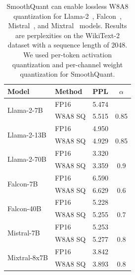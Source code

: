 \begin{table}
\setlength{\tabcolsep}{8pt}
\small
\centering
\caption{SmoothQuant can enable lossless W8A8 quantization for Llama-2~\cite{touvron2023llama2}, Falcon~\cite{almazrouei2023falcon}, Mistral~\cite{jiang2023mistral}, and Mixtral~\cite{jiang2024mixtral} models. Results are perplexities on the WikiText-2 dataset with a sequence length of 2048. We used per-token activation quantization and per-channel weight quantization for SmoothQuant. 
}
\label{tab:more_models}
    \begin{tabular}{llcc}
        \toprule
        Model        & Method    & PPL   & $\alpha$ \\
        \midrule
        \multirow{2}{*}{Llama-2-7B}   & FP16      & 5.474 &       \\
                                       & W8A8 SQ   & 5.515 & 0.85  \\
        \midrule
        \multirow{2}{*}{Llama-2-13B}  & FP16      & 4.950 &       \\
                                       & W8A8 SQ   & 4.929 & 0.85  \\
        \midrule
        \multirow{2}{*}{Llama-2-70B}  & FP16      & 3.320 &       \\
                                       & W8A8 SQ   & 3.359 & 0.9   \\
        \midrule
        \multirow{2}{*}{Falcon-7B}    & FP16      & 6.590 &       \\
                                       & W8A8 SQ   & 6.629 & 0.6   \\
        \midrule
        \multirow{2}{*}{Falcon-40B}   & FP16      & 5.228 &       \\
                                       & W8A8 SQ   & 5.255 & 0.7   \\
        \midrule
        \multirow{2}{*}{Mistral-7B}   & FP16      & 5.253 &       \\
                                       & W8A8 SQ   & 5.277 & 0.8   \\
        \midrule
        \multirow{2}{*}{Mixtral-8x7B} & FP16      & 3.842 &       \\
                                       & W8A8 SQ   & 3.893 & 0.8   \\
        \bottomrule
    \end{tabular}
\end{table}
